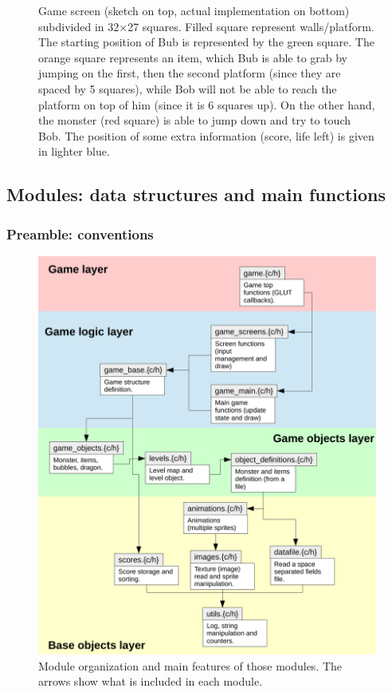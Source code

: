 \documentclass[12pt,a4paper]{article}
\begin{document}
\begin{figure}[!h]
	\caption{Game screen (sketch on top, actual implementation on bottom) subdivided in 32$\times$27 squares. Filled square represent walls/platform. The starting position of Bub is represented by the green square. The orange square represents an item, which Bub is able to grab by jumping on the first, then the second platform (since they are spaced by 5 squares), while Bob will not be able to reach the platform on top of him (since it is 6 squares up). On the other hand, the monster (red square) is able to jump down and try to touch Bob. The position of some extra information (score, life left) is given in lighter blue.}
	\label{fig:4:game}
\end{figure}


\subsection{Modules: data structures and main functions}

\subsubsection{Preamble: conventions}

\begin{figure}[!p]
\centering
\includegraphics[width=.8\linewidth]{i/files}
\caption{Module organization and main features of those modules. The arrows show what is included in each module.}
\label{fig:modules}
\end{figure}
\end{document}
